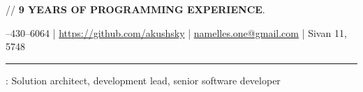 \documentclass[11pt]{article}
\newif\ifdetailed
\begin{document}
%
{\small{// {\textbf{9 YEARS OF PROGRAMMING EXPERIENCE}}. }}

\vspace{0.5em}

--430--6064    |    \url{https://github.com/akushsky}   |   \href{mailto:namelles.one@gmail.com}{namelles.one@gmail.com}  | Sivan 11, 5748

\vspace{0.5em}

\hrule

\vspace{1.5em}

\ifdetailed
\noindent {\textbf{CAREER OBJECTIVE}}: To gain \textbf{international experience} in hi-tech related role (solution architect, senior software engineer, development lead). Preferably working with highload systems, big data and distributed software.
\else
{}: Solution architect, development lead, senior software developer
\fi

\vspace{1em}
\end{document}
